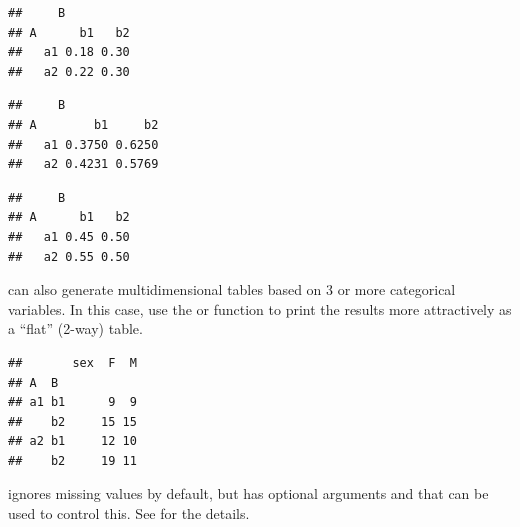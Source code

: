 \documentclass[11pt]{book}
\renewenvironment{knitrout}{\small\renewcommand{\baselinestretch}{.85}}{} %
\begin{document}
\begin{knitrout}
\color{fgcolor}\begin{kframe}
\begin{alltt}
        
\end{alltt}
\begin{verbatim}
##     B
## A      b1   b2
##   a1 0.18 0.30
##   a2 0.22 0.30
\end{verbatim}
\begin{alltt}
 \hlstd{)}     
\end{alltt}
\begin{verbatim}
##     B
## A        b1     b2
##   a1 0.3750 0.6250
##   a2 0.4231 0.5769
\end{verbatim}
\begin{alltt}
 \hlstd{)}     
\end{alltt}
\begin{verbatim}
##     B
## A      b1   b2
##   a1 0.45 0.50
##   a2 0.55 0.50
\end{verbatim}
\end{kframe}
\end{knitrout}

 can  also  generate  multidimensional  tables  based  on  3  or  more
categorical variables. In  this case, use  the   or 
function to print the
results more attractively as a ``flat'' (2-way) table.

\begin{knitrout}
\color{fgcolor}\begin{kframe}
\begin{alltt}
 \hlkwb{<-} \hlstd{(mydata[,}\hlstd{(}\hlstd{,} \hlstd{,} \hlstd{)])}
\end{alltt}
\begin{verbatim}
##       sex  F  M
## A  B           
## a1 b1      9  9
##    b2     15 15
## a2 b1     12 10
##    b2     19 11
\end{verbatim}
\end{kframe}
\end{knitrout}
  ignores missing values by default, but has optional arguments
 and  that can be used to control this.
See  for the details.
\end{document}
